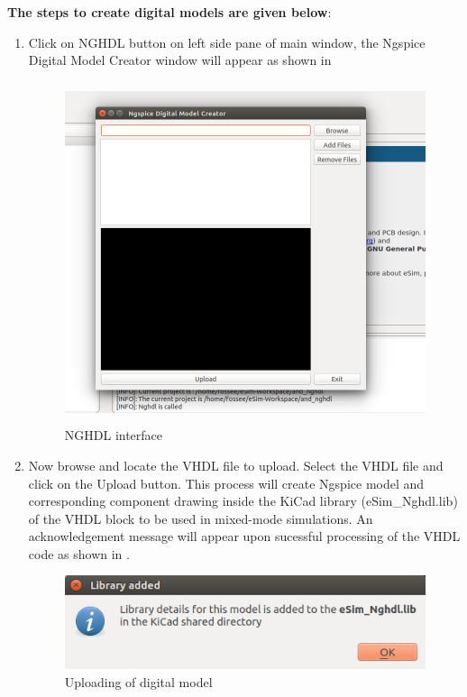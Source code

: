\noindent \textbf{The steps to create digital models are given below}:

\begin{enumerate}
\item Click on NGHDL button on left side pane of main window, the Ngspice Digital Model Creator window will appear as shown in  
        \begin{figure}[!htp]
            \centering
            \includegraphics[height=10cm, width =\lgfig]{./NGHDL/screen3.png}
            \caption{NGHDL interface}
            \label{screen3}
        \end{figure}


\item Now browse and locate the VHDL file to upload. Select the VHDL file and click on the Upload button. This process will create Ngspice model and corresponding component drawing inside the KiCad library (eSim\_Nghdl.lib) of the VHDL block to be used in mixed-mode simulations. An acknowledgement message will appear upon sucessful processing of the VHDL code as shown in . \\

        \begin{figure}[!htp]
            \centering
            \includegraphics[width =\smfig]{./NGHDL/screen4.png}
            \caption{Uploading of digital model}
            \label{upload}
         \end{figure}
         

\end{enumerate}
